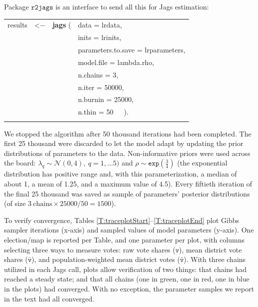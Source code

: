\documentclass[letter,12pt]{article}
\begin{document}
Package $\texttt{r2jags}$ \citep{r.r2jags} is an interface to send all this for Jags estimation:

\begin{center}
\begin{tabular}{ll}
\\
results~~<$-$~~\textbf{jags} ( & data = lrdata, \\ 
                  & inits = lrinits, \\
                  & parameters.to.save = lrparameters, \\
                  & model.file = lambda.rho, \\
                  & n.chains = 3, \\
                  & n.iter = 50000, \\
                  & n.burnin = 25000, \\
                  & n.thin = 50~~~). \\ \\
\end{tabular}
\end{center}

\noindent We stopped the algorithm after 50 thousand iterations had been completed. The first 25 thousand were discarded to let the model adapt by updating the prior distributions of parameters to the data. Non-informative priors were used across the board: $\lambda_q \sim \mathcal{N}(0, 4),~q=1,\ldots5)$ and $\rho \sim \texttt{exp}(\frac{3}{4})$ (the exponential distribution has positive range and, with this parameterization, a median of about 1, a mean of 1.25, and a maximum value of 4.5). Every fiftieth iteration of the final 25 thousand was saved as sample of parameters' posterior distributions (of size $3~\text{chains} \times 25000/50 = 1500$). 

To verify convergence, Tables \ref{T:traceplotStart}--\ref{T:traceplotEnd} plot Gibbs sampler iterations (x-axis) and sampled values of model parameters (y-axis). One election/map is reported per Table, and one parameter per plot, with columns selecting three ways to measure votes: raw vote shares ($\texttt{v}$), mean district vote shares ($\bar{\texttt{v}}$), and population-weighted mean district votes ($\bar{\texttt{v}}$). With three chains utilized in each Jags call, plots allow verification of two things: that chains had reached a steady state; and that all chains (one in green, one in red, one in blue in the plots) had converged. With no exception, the parameter samples we report in the text had all converged.
\end{document}
